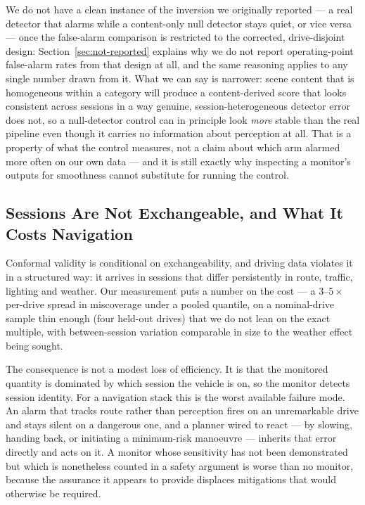 We do not have a clean instance of the inversion we originally reported ---
a real detector that alarms while a content-only null detector stays
quiet, or vice versa --- once the false-alarm comparison is restricted to
the corrected, drive-disjoint design: Section~\ref{sec:not-reported}
explains why we do not report operating-point false-alarm rates from that
design at all, and the same reasoning applies to any single number drawn
from it. What we can say is narrower: scene content that is homogeneous
within a category will produce a content-derived score that looks
consistent across sessions in a way genuine, session-heterogeneous
detector error does not, so a null-detector control can in principle look
\emph{more} stable than the real pipeline even though it carries no
information about perception at all. That is a property of what the
control measures, not a claim about which arm alarmed more often on our
own data --- and it is still exactly why inspecting a monitor's outputs
for smoothness cannot substitute for running the control.

\subsection{Sessions Are Not Exchangeable, and What It Costs Navigation}
\label{sec:discuss-sessions}

Conformal validity is conditional on exchangeability, and driving data
violates it in a structured way: it arrives in sessions that differ
persistently in route, traffic, lighting and weather. Our measurement puts
a number on the cost --- a $3$--$5\times$ per-drive spread in miscoverage
under a pooled quantile, on a nominal-drive sample thin enough (four
held-out drives) that we do not lean on the exact multiple, with
between-session variation comparable in size to the weather effect being
sought.

The consequence is not a modest loss of efficiency. It is that the
monitored quantity is dominated by which session the vehicle is on, so the
monitor detects session identity. For a navigation stack this is the worst
available failure mode. An alarm that tracks route rather than perception
fires on an unremarkable drive and stays silent on a dangerous one, and a
planner wired to react --- by slowing, handing back, or initiating a
minimum-risk manoeuvre --- inherits that error directly and acts on it. A
monitor whose sensitivity has not been demonstrated but which is
nonetheless counted in a safety argument is worse than no monitor, because
the assurance it appears to provide displaces mitigations that would
otherwise be required.

